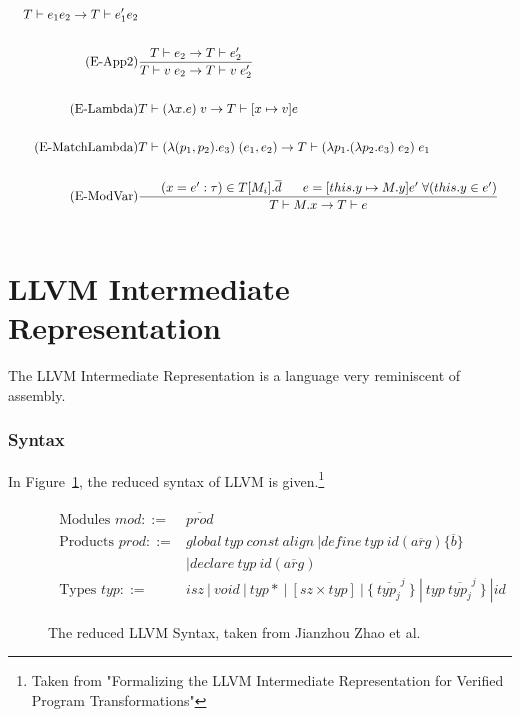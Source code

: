 \documentclass[10pt,a4paper]{report}
\begin{document}
\begin{align*}
{T \vdash e_{1} e_{2} \rightarrow T \vdash e_{1}' e_{2}}\\ \\
\tag{E-App2}
&\frac{T \vdash e_{2} \rightarrow T \vdash e_{2}'}
{T \vdash v\;e_{2} \rightarrow T \vdash v\;e_{2}'}\\ \\
\tag{E-Lambda}
&T \vdash (\lambda x . e) \; v \rightarrow T \vdash [x \mapsto v]e \\ \\
\tag{E-MatchLambda}
&T \vdash (\lambda (p_{1},p_{2}) . e_{3}) \; (e_{1},e_{2}) \rightarrow T \vdash (\lambda p_{1}.(\lambda p_{2}.e_{3})\;e_{2})\; e_{1} \\
\\
\tag{E-ModVar}
&\frac{\;\;\;\;\;\; (x=e':\tau) \in T[M_{i}].\overline{d} \;\;\;\;\;\; e=[this.y\mapsto M.y]e'\;\forall (this.y \in e')}
{T \vdash M.x \rightarrow T \vdash e}\\
\\
\end{align*}
\section{LLVM Intermediate Representation}
The LLVM Intermediate Representation is a language very reminiscent of assembly. 
\subsubsection{Syntax}
In Figure~\ref{fig:LLVMSyntax}, the reduced syntax of LLVM is given.\footnote{Taken from "Formalizing the LLVM Intermediate
Representation for Verified Program
Transformations"}
\begin{figure}[!htb]
\begin{align*}
\begin{aligned}
\text{Modules }\mathit{mod} ::= &\overline{\mathit{prod}} \\
\text{Products }prod ::= & \mathit{global}\ \mathit{typ}\ \mathit{const}\ \mathit{align}\ | \mathit{define\ typ\ id(\overline{arg})\{\overline{b}\}}\\
&| \mathit{declare\ typ\ id(\overline{arg})} \\
\text{Types } \mathit{typ} ::= &\mathit{ isz\ |\ void\ |\ typ*\ |\ \left[sz \times typ\right]\ |\ \lbrace\ \overline{typ_{j}}^{j}\ \rbrace\ |\ typ\ \overline{typ_{j}}^{j}\ \rbrace\ | id}
\end{aligned}
\end{align*}
\label{fig:LLVMSyntax}
\caption{The reduced LLVM Syntax, taken from Jianzhou Zhao et al.}
\end{figure}
\end{document}
